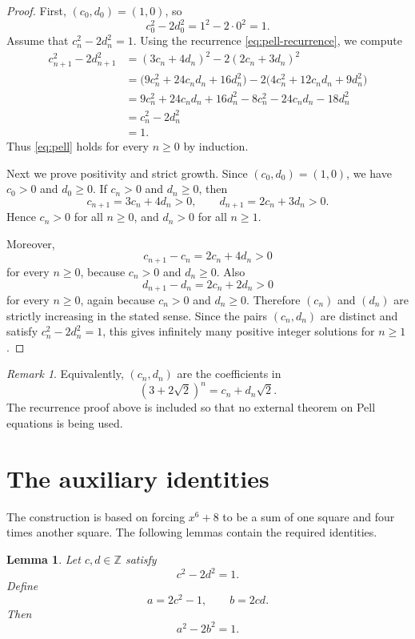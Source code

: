 \documentclass[11pt]{article}
\numberwithin{equation}{section}
\newtheorem{lemma}[theorem]{Lemma}
\theoremstyle{remark}
\newtheorem{remark}[theorem]{Remark}
\begin{document}
\begin{proof}
First, \((c_0,d_0)=(1,0)\), so
\[
    c_0^2-2d_0^2=1^2-2\cdot 0^2=1.
\]
Assume that \(c_n^2-2d_n^2=1\).  Using the recurrence \eqref{eq:pell-recurrence}, we compute
\begin{align*}
    c_{n+1}^2-2d_{n+1}^2
    &=(3c_n+4d_n)^2-2(2c_n+3d_n)^2\\
    &=\bigl(9c_n^2+24c_nd_n+16d_n^2\bigr)
      -2\bigl(4c_n^2+12c_nd_n+9d_n^2\bigr)\\
    &=9c_n^2+24c_nd_n+16d_n^2
      -8c_n^2-24c_nd_n-18d_n^2\\
    &=c_n^2-2d_n^2\\
    &=1.
\end{align*}
Thus \eqref{eq:pell} holds for every \(n\ge 0\) by induction.

Next we prove positivity and strict growth.  Since \((c_0,d_0)=(1,0)\), we have \(c_0>0\) and \(d_0\ge 0\).  If \(c_n>0\) and \(d_n\ge 0\), then
\[
    c_{n+1}=3c_n+4d_n>0,
    \qquad
    d_{n+1}=2c_n+3d_n>0.
\]
Hence \(c_n>0\) for all \(n\ge 0\), and \(d_n>0\) for all \(n\ge 1\).

Moreover,
\[
    c_{n+1}-c_n=2c_n+4d_n>0
\]
for every \(n\ge 0\), because \(c_n>0\) and \(d_n\ge 0\).  Also
\[
    d_{n+1}-d_n=2c_n+2d_n>0
\]
for every \(n\ge 0\), again because \(c_n>0\) and \(d_n\ge 0\).  Therefore \((c_n)\) and \((d_n)\) are strictly increasing in the stated sense.  Since the pairs \((c_n,d_n)\) are distinct and satisfy \(c_n^2-2d_n^2=1\), this gives infinitely many positive integer solutions for \(n\ge 1\).
\end{proof}

\begin{remark}
Equivalently, \((c_n,d_n)\) are the coefficients in
\[
    (3+2\sqrt2)^n=c_n+d_n\sqrt2.
\]
The recurrence proof above is included so that no external theorem on Pell equations is being used.
\end{remark}

\section{The auxiliary identities}

The construction is based on forcing \(x^6+8\) to be a sum of one square and four times another square.  The following lemmas contain the required identities.

\begin{lemma}\label{lem:pell-square}
Let \(c,d\in\mathbb Z\) satisfy
\begin{equation}\label{eq:c-d-pell}
    c^2-2d^2=1.
\end{equation}
Define
\begin{equation}\label{eq:a-b-def}
    a=2c^2-1,
    \qquad
    b=2cd.
\end{equation}
Then
\begin{equation}\label{eq:a-b-pell}
    a^2-2b^2=1.
\end{equation}
\end{lemma}
\end{document}
